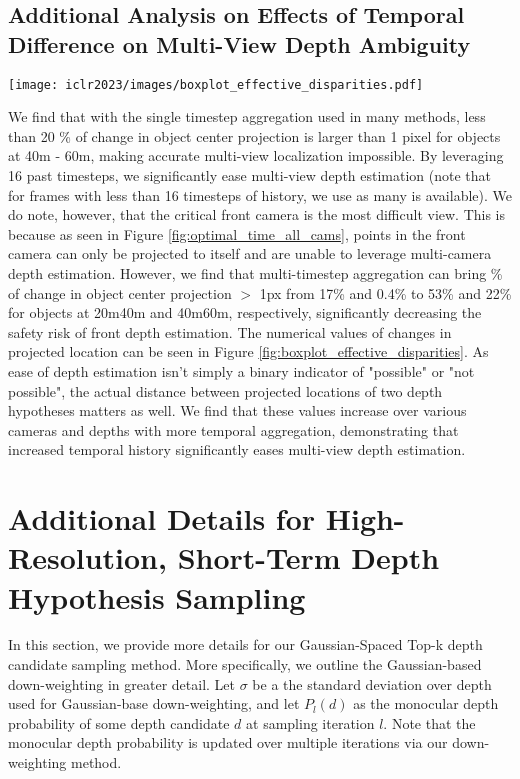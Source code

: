\documentclass[runningheads, hyperfootnotes=false]{article}
\begin{document}
\subsection{Additional Analysis on Effects of Temporal Difference on Multi-View Depth Ambiguity}\label{app:theory_ambig}
\begin{figure*}[t]
  \centering
  \texttt{[image: iclr2023/images/boxplot\_effective\_disparities.pdf]}
  \captionsetup{aboveskip=0pt}\captionsetup{belowskip=0pt}\caption{Visualization of absolute value of change in projected location for object centers induced by a 0.5m change in depth.}
  \label{fig:boxplot_effective_disparities}
\end{figure*} We find that with the single timestep aggregation used in many methods, less than 20 \% of change in object center projection is larger than 1 pixel for objects at 40m - 60m, making accurate multi-view localization impossible. By leveraging 16 past timesteps, we significantly ease multi-view depth estimation (note that for frames with less than 16 timesteps of history, we use as many is available). We do note, however, that the critical front camera is the most difficult view. This is because as seen in Figure \ref{fig:optimal_time_all_cams}, points in the front camera can only be projected to itself and are unable to leverage multi-camera depth estimation. However, we find that multi-timestep aggregation can bring \% of change in object center projection $>$ 1px from 17\% and 0.4\% to 53\% and 22\% for objects at 20m\-40m and 40m\-60m, respectively, significantly decreasing the safety risk of front depth estimation. The numerical values of changes in projected location can be seen in Figure \ref{fig:boxplot_effective_disparities}. As ease of depth estimation isn't simply a binary indicator of "possible" or "not possible", the actual distance between projected locations of two depth hypotheses matters as well. We find that these values increase over various cameras and depths with more temporal aggregation, demonstrating that increased temporal history significantly eases multi-view depth estimation. \section{Additional Details for High-Resolution, Short-Term Depth Hypothesis Sampling}\label{app:sampling}
In this section, we provide more details for our Gaussian-Spaced Top-k depth candidate sampling method. More specifically, we outline the Gaussian-based down-weighting in greater detail. Let $\sigma$ be a the standard deviation over depth used for Gaussian-base down-weighting, and let $P_l(d)$ as the monocular depth probability of some depth candidate $d$ at sampling iteration $l$. Note that the monocular depth probability is updated over multiple iterations via our down-weighting method. 
\end{document}
